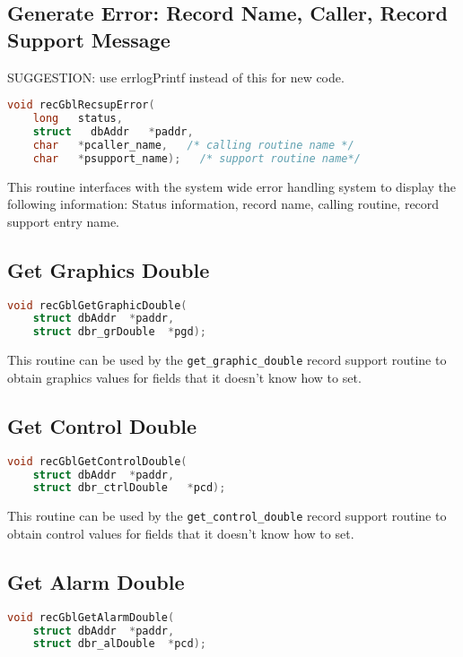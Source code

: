 \subsection{Generate Error: Record Name, Caller, Record Support Message}
SUGGESTION: use errlogPrintf instead of this for new code.
\begin{lstlisting}[language=C]
void recGblRecsupError(
    long   status,
    struct   dbAddr   *paddr,
    char   *pcaller_name,   /* calling routine name */
    char   *psupport_name);   /* support routine name*/
\end{lstlisting}

This routine interfaces with the system wide error handling system to display the following information:
Status information, record name, calling routine, record support entry name.

\subsection{Get Graphics Double}

\begin{lstlisting}[language=C]
void recGblGetGraphicDouble(
    struct dbAddr  *paddr,
    struct dbr_grDouble  *pgd);
\end{lstlisting}

This routine can be used by the \verb|get_graphic_double| record support routine to obtain graphics values for fields that 
it doesn't know how to set.

\subsection{Get Control Double}

\begin{lstlisting}[language=C]
void recGblGetControlDouble(
    struct dbAddr  *paddr,
    struct dbr_ctrlDouble   *pcd);
\end{lstlisting}

This routine can be used by the \verb|get_control_double| record support routine to obtain control values for fields that it 
doesn't know how to set.

\subsection{Get Alarm Double}

\begin{lstlisting}[language=C]
void recGblGetAlarmDouble(
    struct dbAddr  *paddr,
    struct dbr_alDouble  *pcd);
\end{lstlisting}

